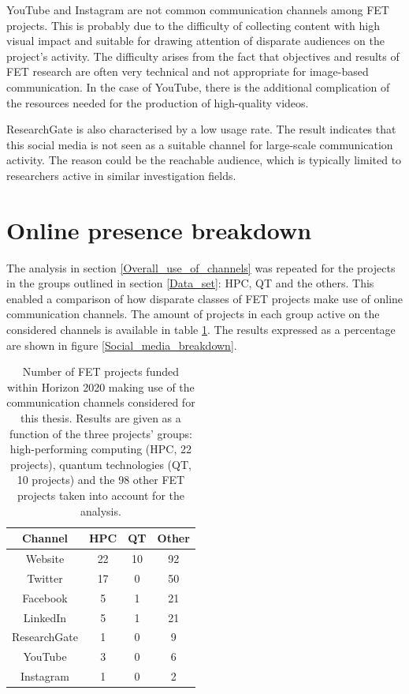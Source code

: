 YouTube and Instagram are not common communication channels among FET projects. This is probably due to the difficulty of collecting content with high visual impact and suitable for drawing attention of disparate audiences on the project's activity. The difficulty arises from the fact that objectives and results of FET research are often very technical and not appropriate for image-based communication. In the case of YouTube, there is the additional complication of the resources needed for the production of high-quality videos.

ResearchGate is also characterised by a low usage rate. The result indicates that this social media is not seen as a suitable channel for large-scale communication activity. The reason could be the reachable audience, which is typically limited to researchers active in similar investigation fields.

\section{Online presence breakdown} \label{Online_presence_breakdown}
The analysis in section \ref{Overall_use_of_channels} was repeated for the projects in the groups outlined in section \ref{Data_set}: HPC, QT and the others. This enabled a comparison of how disparate classes of FET projects make use of online communication channels. The amount of projects in each group active on the considered channels is available in table \ref{Social_media_breakdown_table}. The results expressed as a percentage are shown in figure \ref{Social_media_breakdown}. 

\begin{table}[t]
 \begin{center}
 {\footnotesize
  \begin{tabular}{cccc}
   \hline 
   \hline
   Channel & HPC & QT & Other \\ 
   \hline
   \hline
   Website & 22 & 10 & 92 \\
   Twitter & 17 & 0 & 50 \\
   Facebook & 5 & 1 & 21 \\
   LinkedIn & 5 & 1 & 21 \\
   ResearchGate & 1 & 0 & 9 \\
   YouTube & 3 & 0 & 6 \\
   Instagram & 1 & 0 & 2 \\
   \hline
   \hline
  \end{tabular}
 }
 \end{center} 
 \caption{Number of FET projects funded within Horizon 2020 making use of the communication channels considered for this thesis. Results are given as a function of the three projects' groups: high-performing computing (HPC, 22 projects), quantum technologies (QT, 10 projects) and the 98 other FET projects taken into account for the analysis.}
\label{Social_media_breakdown_table} 
\end{table}

